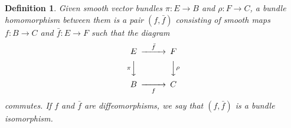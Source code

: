 \documentclass{amsart}          %
\newtheorem{definition}[theorem]{Definition}
\begin{document}
\begin{definition}
	Given smooth vector bundles $\pi:E\to B$ and $\rho:F\to C$, a bundle homomorphism between them is a pair $(f,\bar{f})$ consisting of smooth maps $f:B\to C$ and $\bar{f}:E\to F$ such that the diagram
	$$
	\begin{CD}
	E @>\bar{f}>> F\\
	@V\pi VV  @VV\rho V\\
	B @>>f> C
	\end{CD}
	$$
	commutes. If $f$ and $\bar{f}$ are diffeomorphisms, we say that $(f,\bar{f})$ is a bundle isomorphism.
\end{definition}





\end{document}
